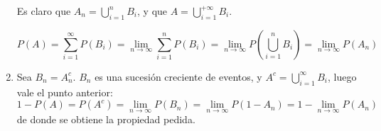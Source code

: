 \begin{enumerate}
		Es claro que $A_n = \bigcup_{i=1}^n B_i$, y que $A = \bigcup_{i=1}^{+\infty} B_i$.
		
		$$P(A) = \sum_{i=1}^{\infty}P(B_i) = \lim_{n\rightarrow \infty}\sum_{i=1}^{n}P(B_i) = \lim_{n\rightarrow \infty}P\left(\bigcup_{i=1}^{n}B_i\right) = \lim_{n\rightarrow\infty}P(A_n)$$
	\item
		Sea $B_n = A_n^c$. $B_n$ es una sucesión creciente de eventos, y $A^c = \bigcup_{i=1}^{\infty} B_i$, luego vale el punto anterior:
		$$1 - P(A) = P(A^c) = \lim_{n\rightarrow \infty} P(B_n) = \lim_{n\rightarrow \infty} P(1 - A_n) = 1 - \lim_{n\rightarrow \infty} P(A_n)$$
		de donde se obtiene la propiedad pedida.
\end{enumerate}
